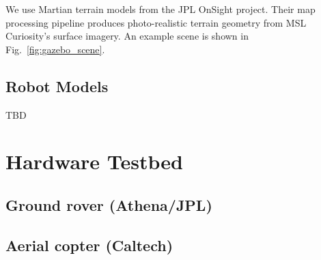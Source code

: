 \documentclass[conference]{IEEEtran}
\begin{document}
We use Martian terrain models from the JPL OnSight project. Their map processing pipeline produces photo-realistic terrain geometry from MSL Curiosity's surface imagery. An example scene is shown in Fig.~\ref{fig:gazebo_scene}.


\subsection{Robot Models}

TBD



\section{Hardware Testbed}

\subsection{Ground rover (Athena/JPL)}


\subsection{Aerial copter (Caltech)}
\end{document}
